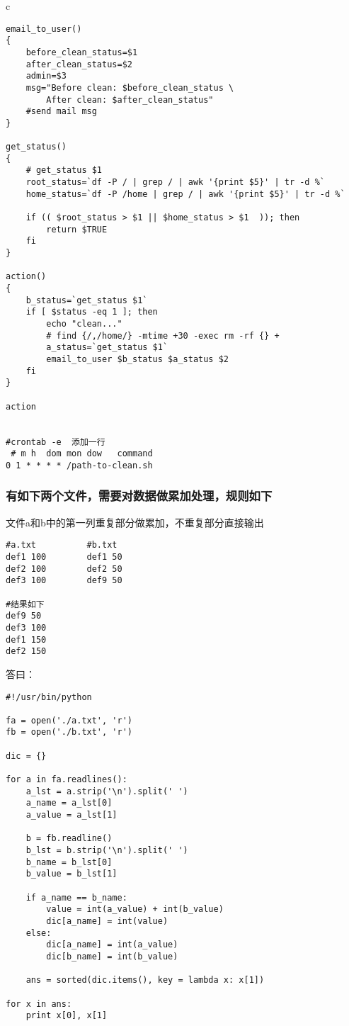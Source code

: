 \documentclass{article}
\begin{document}
\begin{mitned}{c}
\begin{verbatim}
email_to_user()
{
	before_clean_status=$1
	after_clean_status=$2
	admin=$3
	msg="Before clean: $before_clean_status \
		After clean: $after_clean_status"
	#send mail msg
}

get_status()
{
	# get_status $1
	root_status=`df -P / | grep / | awk '{print $5}' | tr -d %`
	home_status=`df -P /home | grep / | awk '{print $5}' | tr -d %`

	if (( $root_status > $1 || $home_status > $1  )); then
		return $TRUE 
	fi
}

action()
{
	b_status=`get_status $1`
	if [ $status -eq 1 ]; then
		echo "clean..."
		# find {/,/home/} -mtime +30 -exec rm -rf {} +
		a_status=`get_status $1`
		email_to_user $b_status $a_status $2
	fi
}

action


#crontab -e  添加一行
 # m h  dom mon dow   command
0 1 * * * * /path-to-clean.sh

\end{verbatim}

\subsubsection{有如下两个文件，需要对数据做累加处理，规则如下}
文件a和b中的第一列重复部分做累加，不重复部分直接输出



\begin{verbatim}
#a.txt			#b.txt
def1 100		def1 50
def2 100		def2 50
def3 100		def9 50

#结果如下
def9 50
def3 100
def1 150
def2 150
\end{verbatim}

答曰：

\begin{verbatim}
#!/usr/bin/python

fa = open('./a.txt', 'r')
fb = open('./b.txt', 'r')

dic = {}

for a in fa.readlines():
	a_lst = a.strip('\n').split(' ')
	a_name = a_lst[0]
	a_value = a_lst[1]
	
	b = fb.readline()
	b_lst = b.strip('\n').split(' ')
	b_name = b_lst[0]
	b_value = b_lst[1]

	if a_name == b_name:
		value = int(a_value) + int(b_value)
		dic[a_name] = int(value)
	else:
		dic[a_name] = int(a_value)
		dic[b_name] = int(b_value)

	ans = sorted(dic.items(), key = lambda x: x[1])

for x in ans:
	print x[0], x[1]
\end{verbatim}


\end{mitned}
\end{document}
